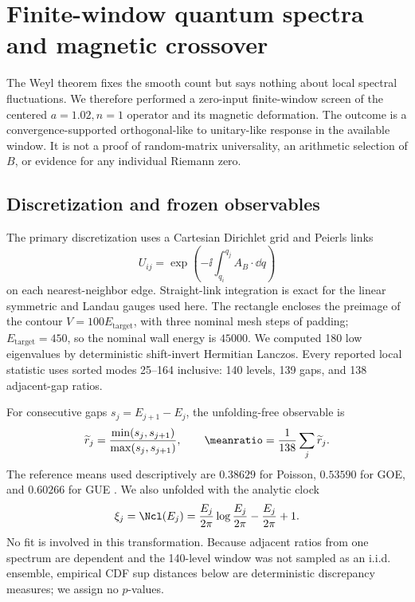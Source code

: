 \section{Finite-window quantum spectra and magnetic crossover}
\label{sec:quantum-spectra}

The Weyl theorem fixes the smooth count but says nothing about local spectral
fluctuations.  We therefore performed a zero-input finite-window screen of the
centered \(a=1.02,n=1\) operator and its magnetic deformation.  The outcome
is a convergence-supported orthogonal-like to unitary-like response in the
available window.  It is not a proof of random-matrix universality, an
arithmetic selection of \(B\), or evidence for any individual Riemann zero.

\subsection{Discretization and frozen observables}

The primary discretization uses a Cartesian Dirichlet grid and Peierls links
\begin{equation}
 U_{ij}=\exp\!\left(-\ii\int_{q_i}^{q_j}A_B\cdot\dd q\right)
 \label{eq:peierls-link}
\end{equation}
on each nearest-neighbor edge.  Straight-link integration is exact for the
linear symmetric and Landau gauges used here.  The rectangle encloses the
preimage of the contour \(V=100E_{\mathrm{target}}\), with three nominal mesh
steps of padding; \(E_{\mathrm{target}}=450\), so the nominal wall energy is
\(45000\).  We computed 180 low eigenvalues by deterministic shift-invert
Hermitian Lanczos.  Every reported local statistic uses sorted modes
25--164 inclusive: 140 levels, 139 gaps, and 138 adjacent-gap ratios.

For consecutive gaps \(s_j=E_{j+1}-E_j\), the unfolding-free observable is
\begin{equation}
 \widetilde r_j=
 \frac{\min(s_j,s_{j+1})}{\max(s_j,s_{j+1})},
 \qquad
 \meanratio=\frac{1}{138}\sum_j\widetilde r_j.
 \label{eq:adjacent-ratio}
\end{equation}
The reference means used descriptively are \(0.38629\) for Poisson,
\(0.53590\) for GOE, and \(0.60266\) for GUE
\citep{AtasEtAl2013}.  We also unfolded with the
analytic clock
\begin{equation}
 \xi_j=\Ncl(E_j)
 =\frac{E_j}{2\pi}\log\frac{E_j}{2\pi}
  -\frac{E_j}{2\pi}+1.
 \label{eq:exact-clock-unfolding}
\end{equation}
No fit is involved in this transformation.  Because adjacent ratios from one
spectrum are dependent and the 140-level window was not sampled as an
i.i.d. ensemble, empirical CDF sup distances below are deterministic
discrepancy measures; we assign no \(p\)-values.

